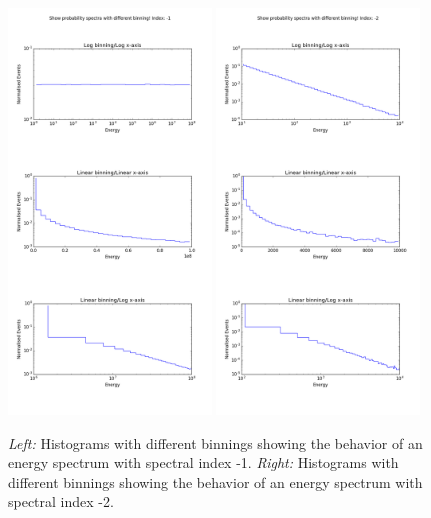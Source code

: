 \begin{appendices}
\begin{figure}
\centering
\includegraphics[width=0.48\textwidth]{appendix/img/probabilitypowerlaw_index1}
\includegraphics[width=0.48\textwidth]{appendix/img/probabilitypowerlaw_index2}
\caption{\textit{Left: }Histograms with different binnings showing the behavior of an energy spectrum with spectral index -1. \textit{Right: }Histograms with different binnings showing the behavior of an energy spectrum with spectral index -2.}
\label{fig:powerlawrandom}
\end{figure}


\end{appendices}
